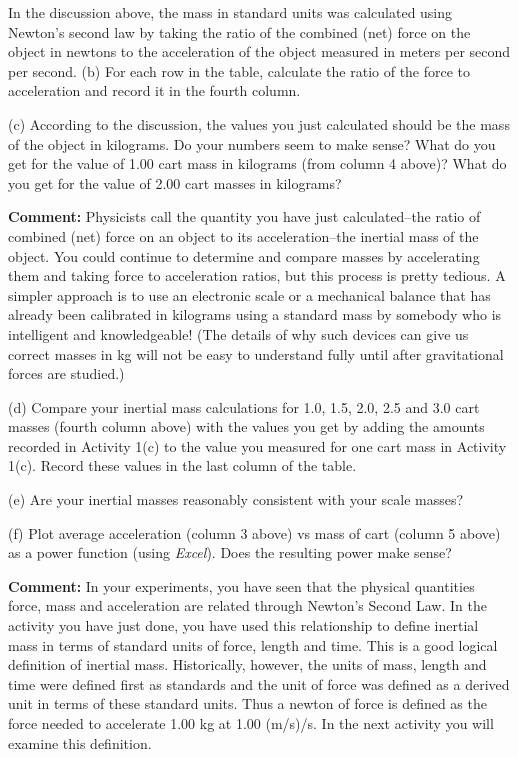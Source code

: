 In the discussion above, the mass in standard units was calculated using Newton's
second law by taking the ratio of the combined (net) force on the object in
newtons to the acceleration of the object measured in meters per second per
second. (b) For each row in the table, calculate the ratio of the force to acceleration
and record it in the fourth column.

(c) According to the discussion, the values you just calculated should be the
mass of the object in kilograms. Do your numbers seem to make sense? What do
you get for the value of 1.00 cart mass in kilograms (from column 4 above)? What do you get for the value of 2.00 cart masses in kilograms?
\vspace{20mm}

\textbf{Comment:} Physicists call the quantity you have just calculated--the
ratio of combined (net) force on an object to its acceleration--the inertial
mass of the object. You could continue to determine and compare masses by accelerating them and taking force to acceleration ratios, but this process is pretty tedious.
A simpler approach is to use an electronic scale or a mechanical balance that
has already been calibrated in kilograms using a standard mass by somebody who
is intelligent and knowledgeable! (The details of why such devices can give
us correct masses in kg will not be easy to understand fully until after gravitational forces are studied.) 

(d) Compare your inertial mass calculations for 1.0, 1.5, 2.0, 2.5 and 3.0 cart
masses (fourth column above) with the values you get by adding the amounts recorded in Activity 1(c) to the value you measured for one cart mass in Activity 1(c). Record these values in the last column of the table.

(e) Are your inertial masses reasonably consistent with your scale masses?
\vspace{10mm}

(f) Plot average acceleration (column 3 above) vs mass of cart (column 5 above) as a power function (using \textit{Excel}). Does the resulting power make sense?
\vspace{10mm}

\textbf{Comment:} In your experiments, you have seen that the physical quantities
force, mass and acceleration are related through Newton's Second Law. In the
activity you have just done, you have used this relationship to define inertial
mass in terms of standard units of force, length and time. This is a good logical
definition of inertial mass. Historically, however, the units of mass, length
and time were defined first as standards and the unit of force was defined as
a derived unit in terms of these standard units. Thus a newton of force is defined
as the force needed to accelerate 1.00 kg at 1.00 (m/s)/s. In the next activity
you will examine this definition. 

